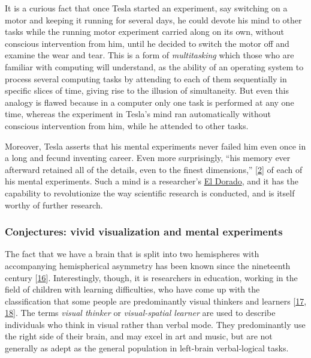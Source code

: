 \documentclass[
  a4paper,
]{article}
\begin{document}
It is a curious fact that once Tesla started an experiment, say
switching on a motor and keeping it running for several days, he could
devote his mind to other tasks while the running motor experiment
carried along on its own, without conscious intervention from him, until
he decided to switch the motor off and examine the wear and tear. This
is a form of \emph{multitasking} which those who are familiar with
computing will understand, as the ability of an operating system to
process several computing tasks by attending to each of them
sequentially in specific slices of time, giving rise to the illusion of
simultaneity. But even this analogy is flawed because in a computer only
one task is performed at any one time, whereas the experiment in Tesla's
mind ran automatically without conscious intervention from him, while he
attended to other tasks.

Moreover, Tesla asserts that his mental experiments never failed him
even once in a long and fecund inventing career. Even more surprisingly,
``his memory ever afterward retained all of the details, even to the
finest dimensions,'' {[}\protect\hyperlink{ref-oneill80}{2}{]} of each
of his mental experiments. Such a mind is a researcher's
\href{https://www.thefreedictionary.com/El+dorado}{El Dorado}, and it
has the capability to revolutionize the way scientific research is
conducted, and is itself worthy of further research.

\hypertarget{conjectures-vivid-visualization-and-mental-experiments}{%
\subsubsection{Conjectures: vivid visualization and mental
experiments}\label{conjectures-vivid-visualization-and-mental-experiments}}

The fact that we have a brain that is split into two hemispheres with
accompanying hemispherical asymmetry has been known since the nineteenth
century {[}\protect\hyperlink{ref-springer89}{16}{]}. Interestingly,
though, it is researchers in education, working in the field of children
with learning difficulties, who have come up with the classification
that some people are predominantly visual thinkers and learners
{[}\protect\hyperlink{ref-silver02}{17},
\protect\hyperlink{ref-west91}{18}{]}. The terms \emph{visual thinker}
or \emph{visual-spatial learner} are used to describe individuals who
think in visual rather than verbal mode. They predominantly use the
right side of their brain, and may excel in art and music, but are not
generally as adept as the general population in left-brain
verbal-logical tasks.
\end{document}
